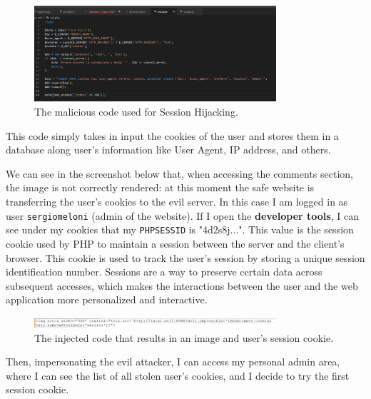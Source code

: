 \documentclass{article}
\begin{document}
\begin{figure}[h]
\centering
\includegraphics[width=0.8\textwidth]{images/14.png}
\caption{The malicious code used for Session Hijacking.}
\label{fig:sesshi2}
\end{figure}

This code simply takes in input the cookies of the user and stores them in a database along user's information like User Agent, IP address, and others.

We can see in the screenshot below that, when accessing the comments section, the image is not correctly rendered: at this moment the safe website is transferring the user's cookies to the evil server. In this case I am logged in as user \texttt{sergiomeloni} (admin of the website). If I open the \textbf{developer tools}, I can see under my cookies that my \texttt{PHPSESSID} is "4d2s8j...". This value is the session cookie used by PHP to maintain a session between the server and the client's browser. This cookie is used to track the user's session by storing a unique session identification number. Sessions are a way to preserve certain data across subsequent accesses, which makes the interactions between the user and the web application more personalized and interactive.

\begin{figure}[h]
\centering
\includegraphics[width=0.8\textwidth]{images/13.png}
\caption{The injected code that results in an image and user's session cookie.}
\label{fig:sesshi3}
\end{figure}

\newpage
Then, impersonating the evil attacker, I can access my personal admin area, where I can see the list of all stolen user's cookies, and I decide to try the first session cookie.
\end{document}
